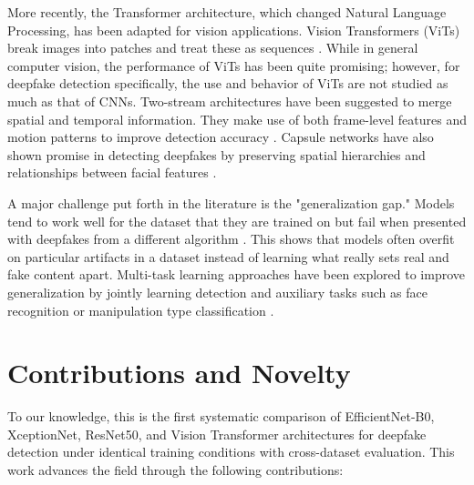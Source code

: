 \documentclass[conference]{IEEEtran}
\begin{document}
More recently, the Transformer architecture, which changed Natural Language Processing, has been adapted for vision applications. Vision Transformers (ViTs) break images into patches and treat these as sequences \cite{vit}. While in general computer vision, the performance of ViTs has been quite promising; however, for deepfake detection specifically, the use and behavior of ViTs are not studied as much as that of CNNs. Two-stream architectures have been suggested to merge spatial and temporal information. They make use of both frame-level features and motion patterns to improve detection accuracy \cite{two_stream}. Capsule networks have also shown promise in detecting deepfakes by preserving spatial hierarchies and relationships between facial features \cite{capsule_networks}.

A major challenge put forth in the literature is the "generalization gap." Models tend to work well for the dataset that they are trained on but fail when presented with deepfakes from a different algorithm \cite{cross_dataset}. This shows that models often overfit on particular artifacts in a dataset instead of learning what really sets real and fake content apart. Multi-task learning approaches have been explored to improve generalization by jointly learning detection and auxiliary tasks such as face recognition or manipulation type classification \cite{multi_task}.

\section{Contributions and Novelty}
To our knowledge, this is the first systematic comparison of EfficientNet-B0, XceptionNet, ResNet50, and Vision Transformer architectures for deepfake detection under identical training conditions with cross-dataset evaluation. This work advances the field through the following contributions:
\end{document}
